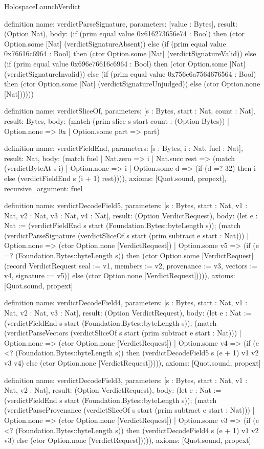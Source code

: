 \begin{lexlean}{HolospaceLaunchVerdict}
\begin{semanticmodule}
definition{
  name: verdictParseSignature,
  parameters: [value : Bytes],
  result: (Option Nat),
  body: (if (prim equal value 0x616273656e74 : Bool) then (ctor Option.some [Nat] (verdictSignatureAbsent)) else (if (prim equal value 0x76616c6964 : Bool) then (ctor Option.some [Nat] (verdictSignatureValid)) else (if (prim equal value 0x696e76616c6964 : Bool) then (ctor Option.some [Nat] (verdictSignatureInvalid)) else (if (prim equal value 0x756e6a7564676564 : Bool) then (ctor Option.some [Nat] (verdictSignatureUnjudged)) else (ctor Option.none [Nat])))))
}

definition{
  name: verdictSliceOf,
  parameters: [s : Bytes, start : Nat, count : Nat],
  result: Bytes,
  body: (match (prim slice s start count : (Option Bytes))
    | Option.none => 0x
    | Option.some part => part)
}

definition{
  name: verdictFieldEnd,
  parameters: [s : Bytes, i : Nat, fuel : Nat],
  result: Nat,
  body: (match fuel
    | Nat.zero => i
    | Nat.succ rest => (match (verdictByteAt s i)
      | Option.none => i
      | Option.some d => (if (d =? 32) then i else (verdictFieldEnd s (i + 1) rest)))),
  axioms: [Quot.sound, propext],
  recursive_argument: fuel
}

definition{
  name: verdictDecodeField5,
  parameters: [s : Bytes, start : Nat, v1 : Nat, v2 : Nat, v3 : Nat, v4 : Nat],
  result: (Option VerdictRequest),
  body: (let e : Nat := (verdictFieldEnd s start (Foundation.Bytes::byteLength s)); (match (verdictParseSignature (verdictSliceOf s start (prim subtract e start : Nat)))
    | Option.none => (ctor Option.none [VerdictRequest])
    | Option.some v5 => (if (e =? (Foundation.Bytes::byteLength s)) then (ctor Option.some [VerdictRequest] (record VerdictRequest {seal := v1, members := v2, provenance := v3, vectors := v4, signature := v5})) else (ctor Option.none [VerdictRequest])))),
  axioms: [Quot.sound, propext]
}

definition{
  name: verdictDecodeField4,
  parameters: [s : Bytes, start : Nat, v1 : Nat, v2 : Nat, v3 : Nat],
  result: (Option VerdictRequest),
  body: (let e : Nat := (verdictFieldEnd s start (Foundation.Bytes::byteLength s)); (match (verdictParseVectors (verdictSliceOf s start (prim subtract e start : Nat)))
    | Option.none => (ctor Option.none [VerdictRequest])
    | Option.some v4 => (if (e <? (Foundation.Bytes::byteLength s)) then (verdictDecodeField5 s (e + 1) v1 v2 v3 v4) else (ctor Option.none [VerdictRequest])))),
  axioms: [Quot.sound, propext]
}

definition{
  name: verdictDecodeField3,
  parameters: [s : Bytes, start : Nat, v1 : Nat, v2 : Nat],
  result: (Option VerdictRequest),
  body: (let e : Nat := (verdictFieldEnd s start (Foundation.Bytes::byteLength s)); (match (verdictParseProvenance (verdictSliceOf s start (prim subtract e start : Nat)))
    | Option.none => (ctor Option.none [VerdictRequest])
    | Option.some v3 => (if (e <? (Foundation.Bytes::byteLength s)) then (verdictDecodeField4 s (e + 1) v1 v2 v3) else (ctor Option.none [VerdictRequest])))),
  axioms: [Quot.sound, propext]
}


\end{semanticmodule}
\end{lexlean}
